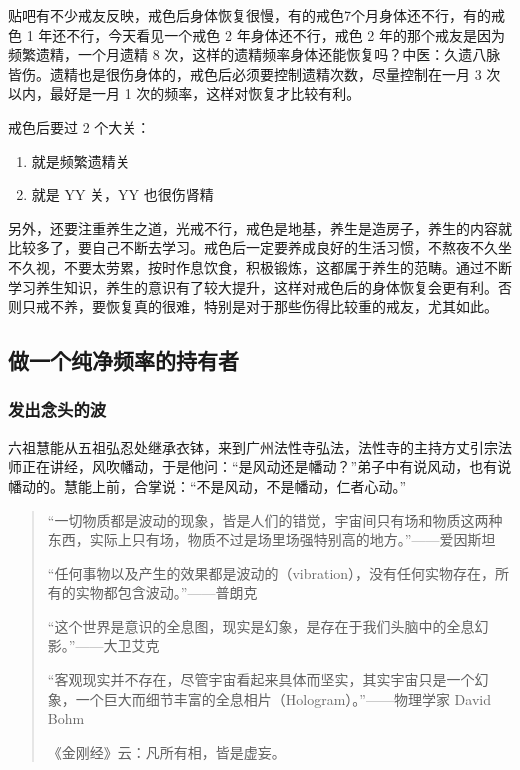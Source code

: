 \documentclass[fontset=founder]{ctexart}
\begin{document}
贴吧有不少戒友反映，戒色后身体恢复很慢，有的戒色7个月身体还不行，有的戒色 1 年还不行，今天看见一个戒色 2 年身体还不行，戒色 2 年的那个戒友是因为频繁遗精，一个月遗精 8 次，这样的遗精频率身体还能恢复吗？中医：久遗八脉皆伤。遗精也是很伤身体的，戒色后必须要控制遗精次数，尽量控制在一月 3 次以内，最好是一月 1 次的频率，这样对恢复才比较有利。

戒色后要过 2 个大关：

\begin{enumerate}
    \item 就是频繁遗精关
    \item 就是 YY 关，YY 也很伤肾精
\end{enumerate}

另外，还要注重养生之道，光戒不行，戒色是地基，养生是造房子，养生的内容就比较多了，要自己不断去学习。戒色后一定要养成良好的生活习惯，不熬夜不久坐不久视，不要太劳累，按时作息饮食，积极锻炼，这都属于养生的范畴。通过不断学习养生知识，养生的意识有了较大提升，这样对戒色后的身体恢复会更有利。否则只戒不养，要恢复真的很难，特别是对于那些伤得比较重的戒友，尤其如此。

\subsection{做一个纯净频率的持有者}

\subsubsection{发出念头的波}

六祖慧能从五祖弘忍处继承衣钵，来到广州法性寺弘法，法性寺的主持方丈引宗法师正在讲经，风吹幡动，于是他问：“是风动还是幡动？”弟子中有说风动，也有说幡动的。慧能上前，合掌说：“不是风动，不是幡动，仁者心动。”

\begin{quotation}
    “一切物质都是波动的现象，皆是人们的错觉，宇宙间只有场和物质这两种东西，实际上只有场，物质不过是场里场强特别高的地方。”\hfill ——爱因斯坦

    “任何事物以及产生的效果都是波动的（vibration），没有任何实物存在，所有的实物都包含波动。”\hfill ——普朗克

    “这个世界是意识的全息图，现实是幻象，是存在于我们头脑中的全息幻影。”\hfill ——大卫艾克

    “客观现实并不存在，尽管宇宙看起来具体而坚实，其实宇宙只是一个幻象，一个巨大而细节丰富的全息相片（Hologram）。”\hfill ——物理学家 David Bohm

    《金刚经》云：凡所有相，皆是虚妄。
\end{quotation}
\end{document}
